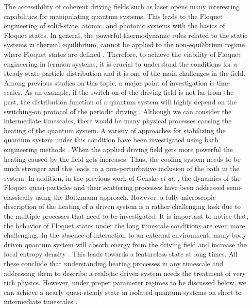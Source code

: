 \documentclass{article}
\begin{document}
The accessibility of coherent driving fields such as laser opens many interesting capabilities for manipulating quantum systems. This leads to the Floquet engineering of solid-state, atomic, and photonic systems with the basics of Floquet states. In general, the powerful thermodynamic rules related to the static systems in thermal equilibrium, cannot be applied to the non-equilibrium regime where Floquet states are defined \cite{seetharam2015}. Therefore, to achieve the viability of Floquet engineering in fermion systems, it is crucial to understand the conditions for a steady-state particle distribution and it is one of the main challenges in the field. Among previous studies on this topic, a major point of investigation is time scales. As an example, if the switch-on of the driving field is not far from the past, the distribution function of a quantum system will highly depend on the switching-on protocol of the periodic driving \cite{dehghani2014}. Although we can consider the intermediate timescales, there would be many physical processes causing the heating of the quantum system. A variety of approaches for stabilizing the quantum system under this condition have been investigated using bath engineering methods \cite{seetharam2015,weidinger2017,seetharam2019,rudner2020}. When the applied driving field gets more powerful the heating caused by the field gets increases. Thus, the cooling system needs to be much stronger and this leads to a non-perturbative inclusion of the bath in the system. In addition, in the previous work of Genske \textit{et al.} \cite{genske2015}, the dynamics of the Floquet quasi-particles and their scattering processes have been addressed semi-classically using the Boltzmann approach.
However, a fully microscopic description of the heating of a driven system is a rather challenging task due to the multiple processes that need to be investigated.
It is important to notice that, the behavior of Floquet states under the long timescale conditions are even more challenging. In the absence of interaction to an external environment, many-body driven quantum system will absorb energy from the driving field and increase the local entropy density \cite{rudner2020}. This leads towards a featureless state at long times. All these conclude that understanding heating processes in any timescale and addressing them to describe a realistic driven system needs the treatment of very rich physics. However, under proper parameter regimes to be discussed below, we can achieve a nearly quasi-steady state in isolated quantum systems on short to intermediate timescales \cite{lindner2017,bukov2015,eckardt2015,kuwahara2016,abanin2017,mori2018,rudner2020}.
\end{document}
